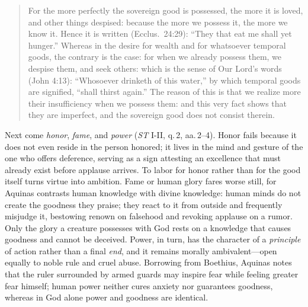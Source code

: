 \begin{quote}
For the more perfectly the sovereign good is possessed, the more it is loved, and other things despised: because the more we possess it, the more we know it. Hence it is written (Ecclus.\ 24:29): ``They that eat me shall yet hunger.'' Whereas in the desire for wealth and for whatsoever temporal goods, the contrary is the case: for when we already possess them, we despise them, and seek others: which is the sense of Our Lord's words (John 4:13): ``Whosoever drinketh of this water,'' by which temporal goods are signified, ``shall thirst again.'' The reason of this is that we realize more their insufficiency when we possess them: and this very fact shows that they are imperfect, and the sovereign good does not consist therein.
\end{quote}

Next come \emph{honor}, \emph{fame}, and \emph{power} (\emph{ST} I-II, q.\,2, aa.\,2--4). Honor fails because it does not even reside in the person honored; it lives in the mind and gesture of the one who offers deference, serving as a sign attesting an excellence that must already exist before applause arrives. To labor for honor rather than for the good itself turns virtue into ambition. Fame or human glory fares worse still, for Aquinas contrasts human knowledge with divine knowledge: human minds do not create the goodness they praise; they react to it from outside and frequently misjudge it, bestowing renown on falsehood and revoking applause on a rumor. Only the glory a creature possesses with God rests on a knowledge that causes goodness and cannot be deceived. Power, in turn, has the character of a \emph{principle} of action rather than a final \emph{end}, and it remains morally ambivalent---open equally to noble rule and cruel abuse. Borrowing from Boethius, Aquinas notes that the ruler surrounded by armed guards may inspire fear while feeling greater fear himself; human power neither cures anxiety nor guarantees goodness, whereas in God alone power and goodness are identical.

